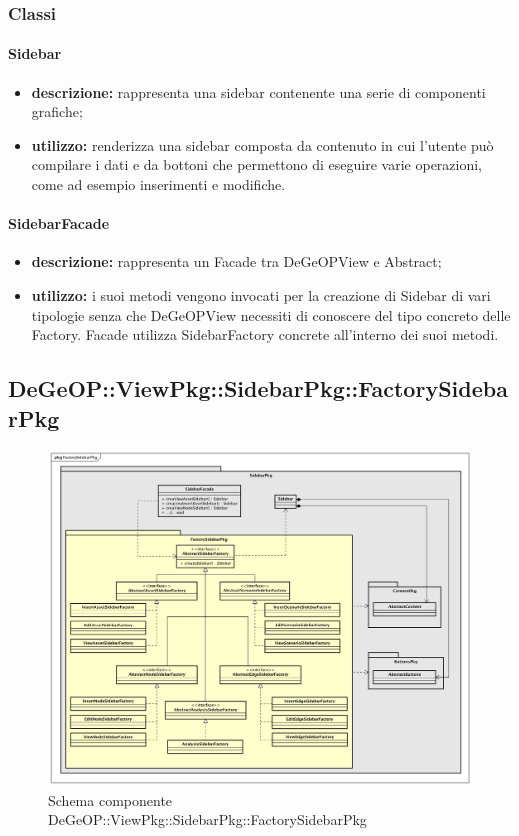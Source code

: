 \subsubsection{Classi}
\paragraph{Sidebar}
\begin{itemize}
	\item \textbf{descrizione:} rappresenta una sidebar contenente una serie di componenti grafiche;
	\item \textbf{utilizzo:} renderizza una sidebar composta da contenuto in cui l'utente può compilare i dati e da bottoni che permettono di eseguire varie operazioni, come ad esempio inserimenti e modifiche.
\end{itemize}
\paragraph{SidebarFacade}
\begin{itemize}
	\item \textbf{descrizione:} rappresenta un Facade tra DeGeOPView e Abstract;
	\item \textbf{utilizzo:} i suoi metodi vengono invocati per la creazione di Sidebar di vari tipologie senza che DeGeOPView necessiti di conoscere del tipo concreto delle Factory. Facade utilizza SidebarFactory concrete all'interno dei suoi metodi.
\end{itemize}
\newpage
\subsection{DeGeOP::ViewPkg::SidebarPkg::FactorySidebarPkg}
\label{pkg::FactorySidebarPkg}
\begin{figure}[H]
	\centering
	\includegraphics[width=\textwidth]{img/PkgDiagram/STFactorySidebarPkg.png}
	\caption{Schema componente DeGeOP::ViewPkg::SidebarPkg::FactorySidebarPkg}
\end{figure}
